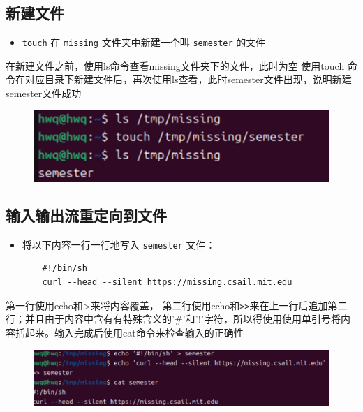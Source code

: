 \documentclass[a4paper, 12pt]{article}
\begin{document}
\subsection{新建文件}
\begin{itemize}
 
    \item \verb|touch| 在 \verb|missing| 文件夹中新建一个叫 \verb|semester| 的文件 
\end{itemize}
在新建文件之前，使用ls命令查看missing文件夹下的文件，此时为空
使用touch 命令在对应目录下新建文件后，再次使用ls查看，此时semester文件出现，说明新建semester文件成功
\begin{figure}[H]
    \centering
    \includegraphics[width=1\linewidth]{shell2.png}
\end{figure}



\subsection{输入输出流重定向到文件}
\begin{itemize}
    \item 将以下内容一行一行地写入 \verb|semester| 文件： 
    \begin{verbatim}
    #!/bin/sh
    curl --head --silent https://missing.csail.mit.edu
    \end{verbatim}
\end{itemize}\par
第一行使用echo和>来将内容覆盖，
第二行使用echo和\verb|>>|来在上一行后追加第二行；并且由于内容中含有有特殊含义的'\#'和'!'字符，所以得使用使用单引号将内容括起来。输入完成后使用cat命令来检查输入的正确性
\begin{figure}[H]
    \centering
    \includegraphics[width=1\linewidth]{shell3.png}
\end{figure}
\end{document}
